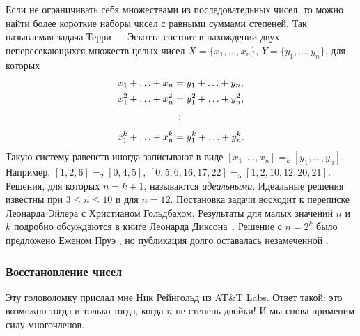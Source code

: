 \begin{addedbytheeditors}
Если не ограничивать себя множествами из последовательных чисел, то можно найти более короткие наборы чисел с равными суммами степеней.
Так называемая задача Терри --- Эскотта  состоит в нахождении двух непересекающихся множеств целых чисел $X=\{x_1,\ldots,x_n\}$, $Y=\{y_1,\ldots,y_n\}$, для которых
\begin{align*}
    x_1+\ldots+x_n&=y_1+\ldots+y_n,\\
    x_1^2+\ldots+x_n^2&=y_1^2+\ldots+y_n^2,\\
    &\hskip.5em\vdots\\
    x_1^k+\ldots+x_n^k&=y_1^k+\ldots+y_n^k.
\end{align*}
Такую систему равенств иногда записывают в виде $[x_1,\ldots,x_n]=_k[y_1,\ldots,y_n]$.
Например, $[1, 2, 6] =_2 [0, 4, 5 ]$, $[  0, 5, 6, 16, 17, 22] =_5 [1, 2, 10, 12, 20, 21].$
Решения, для которых $n=k+1$, называются \textit{идеальными}.
Идеальные решения известны при $3\le n\le 10$ и для $n=12$.
Постановка задачи восходит к переписке Леонарда Эйлера с Христианом Гольдбахом.
Результаты для малых значений $n$ и $k$ подробно обсуждаются в книге Леонарда Диксона~\cite{Dickson1941}.
Решение с $n=2^k$ было предложено Еженом Пруэ \cite{prouhet}, но публикация долго оставалась незамеченной \cite{writght}.
\pr
\end{addedbytheeditors}

\subsubsection*{Восстановление чисел}

Эту головоломку прислал мне Ник Рейнгольд из AT\&T Labs.
Ответ такой: это возможно тогда и только тогда, когда $n$ не степень двойки!
И мы снова применим силу многочленов.

